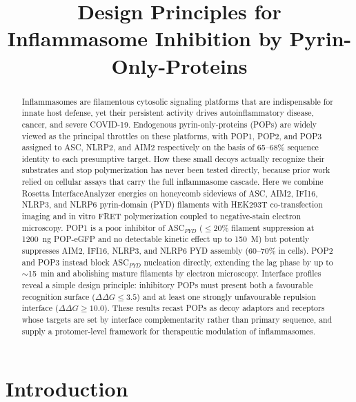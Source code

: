 \documentclass[11pt]{article}
\title{Design Principles for Inflammasome Inhibition by Pyrin-Only-Proteins}
\author{}
\date{}
\begin{document}
\maketitle

\begin{abstract}
Inflammasomes are filamentous cytosolic signaling platforms that are
indispensable for innate host defense, yet their persistent activity drives
autoinflammatory disease, cancer, and severe COVID-19. Endogenous
pyrin-only-proteins (POPs) are widely viewed as the principal throttles on
these platforms, with POP1, POP2, and POP3 assigned to ASC, NLRP2, and AIM2
respectively on the basis of 65--68\% sequence identity to each presumptive
target. How these small decoys actually recognize their substrates and stop
polymerization has never been tested directly, because prior work relied on
cellular assays that carry the full inflammasome cascade. Here we combine
Rosetta InterfaceAnalyzer energies on honeycomb sideviews of ASC, AIM2,
IFI16, NLRP3, and NLRP6 pyrin-domain (PYD) filaments with HEK293T
co-transfection imaging and in vitro FRET polymerization coupled to
negative-stain electron microscopy. POP1 is a poor inhibitor of ASC$_{PYD}$
($\leq 20$\% filament suppression at 1200~ng POP-eGFP and no detectable
kinetic effect up to 150~\textmu M) but potently suppresses AIM2, IFI16,
NLRP3, and NLRP6 PYD assembly (60--70\% in cells). POP2 and POP3 instead
block ASC$_{PYD}$ nucleation directly, extending the lag phase by up to
$\sim$15~min and abolishing mature filaments by electron microscopy. Interface
profiles reveal a simple design principle: inhibitory POPs must present both
a favourable recognition surface ($\Delta\Delta G \leq 3.5$) and at least one
strongly unfavourable repulsion interface ($\Delta\Delta G \geq 10.0$). These
results recast POPs as decoy adaptors and receptors whose targets are set by
interface complementarity rather than primary sequence, and supply a
protomer-level framework for therapeutic modulation of inflammasomes.
\end{abstract}

\section{Introduction}
\end{document}
